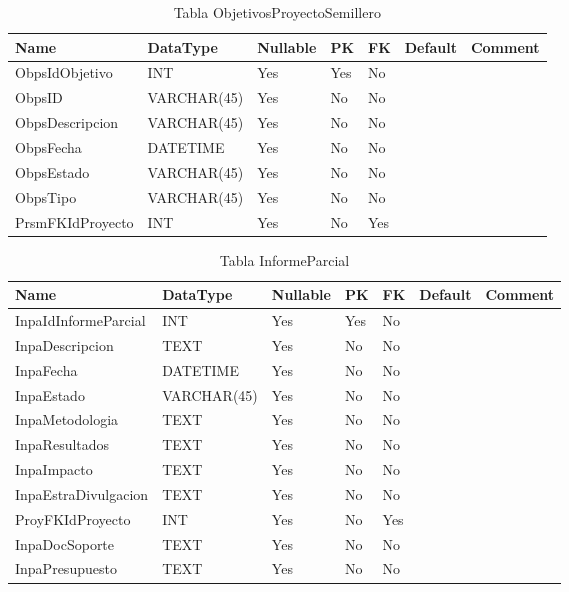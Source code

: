 \begin{table}
	\caption{Tabla ObjetivosProyectoSemillero}
	\label{labelTableObjetivosProyectoSemillero}
	\begin{tabular}{ |l|l|l|l|l|l|l| }
		\hline
		Name & DataType & Nullable & PK & FK & Default & Comment \\ \hline
		ObpsIdObjetivo & INT & Yes & Yes & No &  & \\ \hline 
		ObpsID & VARCHAR(45) & Yes & No & No &  & \\ \hline 
		ObpsDescripcion & VARCHAR(45) & Yes & No & No &  & \\ \hline 
		ObpsFecha & DATETIME & Yes & No & No &  & \\ \hline 
		ObpsEstado & VARCHAR(45) & Yes & No & No &  & \\ \hline 
		ObpsTipo & VARCHAR(45) & Yes & No & No &  & \\ \hline 
		PrsmFKIdProyecto & INT & Yes & No & Yes &  & \\ \hline 
		
	\end{tabular}
\end{table}


\begin{table}
	\caption{Tabla InformeParcial}
	\label{labelTableInformeParcial}
	\begin{tabular}{ |l|l|l|l|l|l|l| }
		\hline
		Name & DataType & Nullable & PK & FK & Default & Comment \\ \hline
		InpaIdInformeParcial & INT & Yes & Yes & No &  & \\ \hline 
		InpaDescripcion & TEXT & Yes & No & No &  & \\ \hline 
		InpaFecha & DATETIME & Yes & No & No &  & \\ \hline 
		InpaEstado & VARCHAR(45) & Yes & No & No &  & \\ \hline 
		InpaMetodologia & TEXT & Yes & No & No &  & \\ \hline 
		InpaResultados & TEXT & Yes & No & No &  & \\ \hline 
		InpaImpacto & TEXT & Yes & No & No &  & \\ \hline 
		InpaEstraDivulgacion & TEXT & Yes & No & No &  & \\ \hline 
		ProyFKIdProyecto & INT & Yes & No & Yes &  & \\ \hline 
		InpaDocSoporte & TEXT & Yes & No & No &  & \\ \hline 
		InpaPresupuesto & TEXT & Yes & No & No &  & \\ \hline 
		
	\end{tabular}
\end{table}


